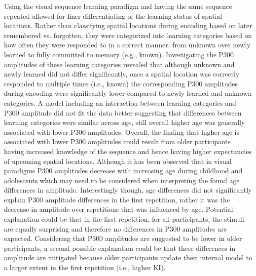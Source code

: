 Using the visual sequence learning paradigm and having the same sequence repeated allowed for finer differentiating of the learning status of spatial locations. Rather than classifying spatial locations during encoding based on later remembered vs. forgotten, they were categorized into learning categories based on how often they were responded to in a correct manner: from unknown over newly learned to fully committed to memory (e.g., known). Investigating the P300 amplitudes of these learning categories revealed that although unknown and newly learned did not differ significantly, once a spatial location was correctly responded to multiple times (i.e., known) the corresponding P300 amplitudes during encoding were significantly lower compared to newly learned and unknown categories. A model including an interaction between learning categories and P300 amplitude did not fit the data better suggesting that differences between learning categories were similar across age, still overall higher age was generally associated with lower P300 amplitudes. Overall, the finding that higher age is associated with lower P300 amplitudes could result from older participants having increased knowledge of the sequence and hence having higher expectancies of upcoming spatial locations. Although it has been observed that in visual paradigms P300 amplitudes decrease with increasing age during childhood and adolescents \parencite{rigginsP300DevelopmentInfancy2020,stigeDevelopmentVisualP3a2007} which may need to be considered when interpreting the found age differences in amplitude. Interestingly though, age differences did not significantly explain P300 amplitude differences in the first repetition, rather it was the decrease in amplitude over repetitions that was influenced by age. Potential explanation could be that in the first repetition, for all participants, the stimuli are equally surprising and therefore no differences in P300 amplitudes are expected. Considering that P300 amplitudes are suggested to be lower in older participants, a second possible explanation could be that these differences in amplitude are mitigated because older participants update their internal model to a larger extent in the first repetition (i.e., higher KI). 


